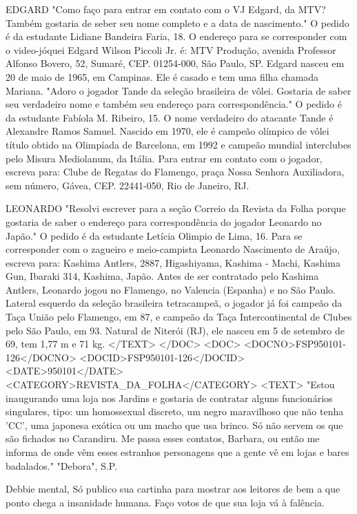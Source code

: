 EDGARD
"Como faço para entrar em contato com o VJ Edgard, da MTV? Também gostaria de seber seu nome completo e a data de nascimento." O pedido é da estudante Lidiane Bandeira Faria, 18.
O endereço para se corresponder com o video-jóquei Edgard Wilson Piccoli Jr. é: MTV Produção, avenida Professor Alfonso Bovero, 52, Sumaré, CEP. 01254-000, São Paulo, SP. Edgard nasceu em 20 de maio de 1965, em Campinas. Ele é casado e tem uma filha chamada Mariana.
"Adoro o jogador Tande da seleção brasileira de vôlei. Gostaria de saber seu verdadeiro nome e também seu endereço para correspondência." O pedido é da estudante Fabíola M. Ribeiro, 15.
O nome verdadeiro do atacante Tande é Alexandre Ramos Samuel. Nascido em 1970, ele é campeão olímpico de vôlei título obtido na Olimpíada de Barcelona, em 1992 e campeão mundial interclubes pelo Misura Mediolanum, da Itália. Para entrar em contato com o jogador, escreva para: Clube de Regatas do Flamengo, praça Nossa Senhora Auxiliadora, sem número, Gávea, CEP. 22441-050, Rio de Janeiro, RJ.

LEONARDO
"Resolvi escrever para a seção Correio da Revista da Folha porque gostaria de saber o endereço para correspondência do jogador Leonardo no Japão." O pedido é da estudante Letícia Olimpio de Lima, 16.
Para se corresponder com o zagueiro e meio-campista Leonardo Nascimento de Araújo, escreva para: Kashima Antlers, 2887, Higashiyama, Kashima - Machi, Kashima  Gun, Ibaraki 314, Kashima, Japão. Antes de ser contratado pelo Kashima Antlers, Leonardo jogou no Flamengo, no Valencia (Espanha) e no São Paulo. Lateral esquerdo da seleção brasileira tetracampeã, o jogador já foi campeão da Taça União pelo Flamengo, em 87, e campeão da Taça Intercontinental de Clubes pelo São Paulo, em 93. Natural de Niterói (RJ), ele nasceu em 5 de setembro de 69, tem 1,77 m e 71 kg.
</TEXT>
</DOC>
<DOC>
<DOCNO>FSP950101-126</DOCNO>
<DOCID>FSP950101-126</DOCID>
<DATE>950101</DATE>
<CATEGORY>REVISTA_DA_FOLHA</CATEGORY>
<TEXT>
"Estou inaugurando uma loja nos Jardins e gostaria de contratar alguns funcionários singulares, tipo: um homossexual discreto, um negro maravilhoso que não tenha 'CC', uma japonesa exótica ou um macho que usa brinco. Só não servem os que são fichados no Carandiru. Me passa esses contatos, Barbara, ou então me informa de onde vêm esses estranhos personagens que a gente vê em lojas e bares badalados."
"Debora", S.P.

Debbie mental,
Só publico sua cartinha para mostrar aos leitores de bem a que ponto chega a insanidade humana. Faço votos de que sua loja vá à falência.


